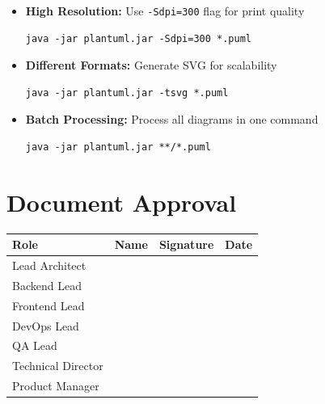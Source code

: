 \documentclass[12pt,a4paper]{report}
\begin{document}
\begin{itemize}
    \item \textbf{High Resolution:} Use \texttt{-Sdpi=300} flag for print quality
    \begin{lstlisting}[style=bashStyle]
java -jar plantuml.jar -Sdpi=300 *.puml
    \end{lstlisting}
    
    \item \textbf{Different Formats:} Generate SVG for scalability
    \begin{lstlisting}[style=bashStyle]
java -jar plantuml.jar -tsvg *.puml
    \end{lstlisting}
    
    \item \textbf{Batch Processing:} Process all diagrams in one command
    \begin{lstlisting}[style=bashStyle]
java -jar plantuml.jar **/*.puml
    \end{lstlisting}
\end{itemize}


\chapter*{Document Approval}

\begin{table}[H]
\centering
\begin{tabular}{|l|p{4cm}|p{4cm}|p{3cm}|}
\hline
\textbf{Role} & \textbf{Name} & \textbf{Signature} & \textbf{Date} \\
\hline
Lead Architect & & & \\[0.8cm]
\hline
Backend Lead & & & \\[0.8cm]
\hline
Frontend Lead & & & \\[0.8cm]
\hline
DevOps Lead & & & \\[0.8cm]
\hline
QA Lead & & & \\[0.8cm]
\hline
Technical Director & & & \\[0.8cm]
\hline
Product Manager & & & \\[0.8cm]
\hline
\end{tabular}
\end{table}

\vspace{2cm}
\end{document}
